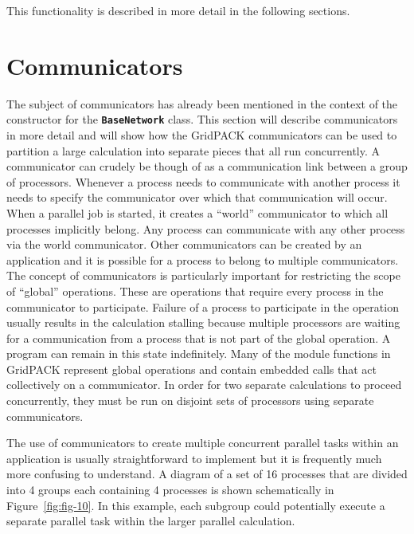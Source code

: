 \documentclass[12pt]{report} %
\begin{document}
This functionality is described in more detail in the following sections.

\section{Communicators}

The subject of communicators has already been mentioned in the context of the constructor for the \texttt{\textbf{BaseNetwork}} class. This section will describe communicators in more detail and will show how the GridPACK communicators can be used to partition a large calculation into separate pieces that all run concurrently. A communicator can crudely be though of as a communication link between a group of processors. Whenever a process needs to communicate with another process it needs to specify the communicator over which that communication will occur. When a parallel job is started, it creates a ``world'' communicator to which all processes implicitly belong. Any process can communicate with any other process via the world communicator. Other communicators can be created by an application and it is possible for a process to belong to multiple communicators. The concept of communicators is particularly important for restricting the scope of ``global'' operations. These are operations that require every process in the communicator to participate. Failure of a process to participate in the operation usually results in the calculation stalling because multiple processors are waiting for a communication from a process that is not part of the global operation. A program can remain in this state indefinitely. Many of the module functions in GridPACK represent global operations and contain embedded calls that act collectively on a communicator. In order for two separate calculations to proceed concurrently, they must be run on disjoint sets of processors using separate communicators.

The use of communicators to create multiple concurrent parallel tasks within an application is usually straightforward to implement but it is frequently much more confusing to understand. A diagram of a set of 16 processes that are divided into 4 groups each containing 4 processes is shown schematically in Figure~\ref{fig:fig-10}. In this example, each subgroup could potentially execute a separate parallel task within the larger parallel calculation.
\end{document}
